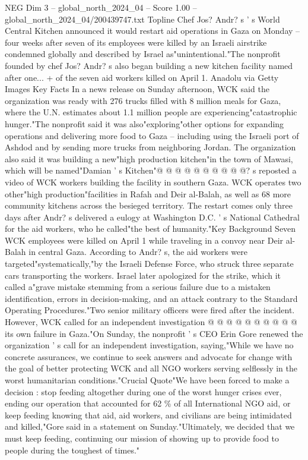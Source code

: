 \begin{textsample}{NEG Dim 3 – global\_north\_2024\_04 – Score 1.00 – global\_north\_2024\_04/200439747.txt}  \label{ex:f3_neg_399}
Topline Chef Jos?
Andr? s ' s World Central Kitchen announced it would restart aid operations in Gaza on Monday -- four weeks after seven of its employees were killed by an Israeli airstrike condemned globally and described by Israel as"unintentional."The nonprofit founded by chef Jos?
Andr? s also began building a new kitchen facility named after one... + of the seven aid workers killed on April 1.
Anadolu via Getty Images Key Facts In a news release on Sunday afternoon, WCK said the organization was ready with 276 trucks filled with 8 million meals for Gaza, where the U.N. estimates about 1.1 million people are experiencing"catastrophic hunger."The nonprofit said it was also"exploring"other options for expanding operations and delivering more food to Gaza -- including using the Israeli port of Ashdod and by sending more trucks from neighboring Jordan.
The organization also said it was building a new"high production kitchen"in the town of Mawasi, which will be named"Damian ' s Kitchen"@ @ @ @ @ @ @ @ @ @? s reposted a video of WCK workers building the facility in southern Gaza.
WCK operates two other"high production"facilities in Rafah and Deir al-Balah, as well as 68 more community kitchens across the besieged territory.
The restart comes only three days after Andr? s delivered a eulogy at Washington D.C. ' s National Cathedral for the aid workers, who he called"the best of humanity."Key Background Seven WCK employees were killed on April 1 while traveling in a convoy near Deir al-Balah in central Gaza.
According to Andr? s, the aid workers were targeted"systematically,"by the Israeli Defense Force, who struck three separate cars transporting the workers.
Israel later apologized for the strike, which it called a"grave mistake stemming from a serious failure due to a mistaken identification, errors in decision-making, and an attack contrary to the Standard Operating Procedures."Two senior military officers were fired after the incident.
However, WCK called for an independent investigation @ @ @ @ @ @ @ @ @ @ its own failure in Gaza."On Sunday, the nonprofit ' s CEO Erin Gore renewed the organization ' s call for an independent investigation, saying,"While we have no concrete assurances, we continue to seek answers and advocate for change with the goal of better protecting WCK and all NGO workers serving selflessly in the worst humanitarian conditions."Crucial Quote"We have been forced to make a decision : stop feeding altogether during one of the worst hunger crises ever, ending our operation that accounted for 62 \% of all International NGO aid, or keep feeding knowing that aid, aid workers, and civilians are being intimidated and killed,"Gore said in a statement on Sunday."Ultimately, we decided that we must keep feeding, continuing our mission of showing up to provide food to people during the toughest of times."

\end{textsample}
